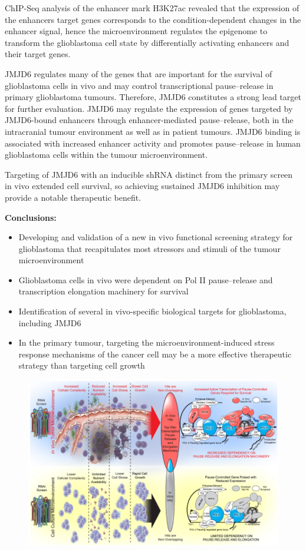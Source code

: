 ChIP-Seq analysis of the enhancer mark H3K27ac revealed that the expression of the enhancers target genes corresponds to the condition-dependent changes in the enhancer signal, hence the microenvironment regulates the epigenome to transform the glioblastoma cell state by differentially activating enhancers and their target genes.

JMJD6 regulates many of the genes that are important for the survival of glioblastoma cells in vivo and may control transcriptional pause–release in primary glioblastoma tumours. Therefore, JMJD6 constitutes a strong lead target for further evaluation. JMJD6 may regulate the expression of genes targeted by JMJD6-bound enhancers through enhancer-mediated pause–release, both in the intracranial tumour environment as well as in patient tumours. JMJD6 binding is associated with increased enhancer activity and promotes pause–release in human glioblastoma cells within the tumour microenvironment.

Targeting of JMJD6 with an inducible shRNA distinct from the primary screen in vivo extended cell survival, so achieving sustained JMJD6 inhibition may provide a notable therapeutic benefit.

\textbf{Conclusions:}
\begin{itemize}
\item Developing and validation of a new in vivo functional screening strategy for glioblastoma that recapitulates most stressors and ­stimuli of the tumour microenvironment
\item Glioblastoma cells in vivo were dependent on Pol II pause–release and transcription elongation machinery for survival
\item Identification of several in vivo-specific biological targets for glioblastoma, including JMJD6
\item In the primary tumour, targeting the microenvironment-induced stress response mechanisms of the cancer cell may be a more effective therapeutic strategy than targeting cell growth
\end{itemize}

\begin{figure}
\centering
\includegraphics[width=\textwidth]{../_resources/RNAi.png}
\caption{}
\end{figure}

